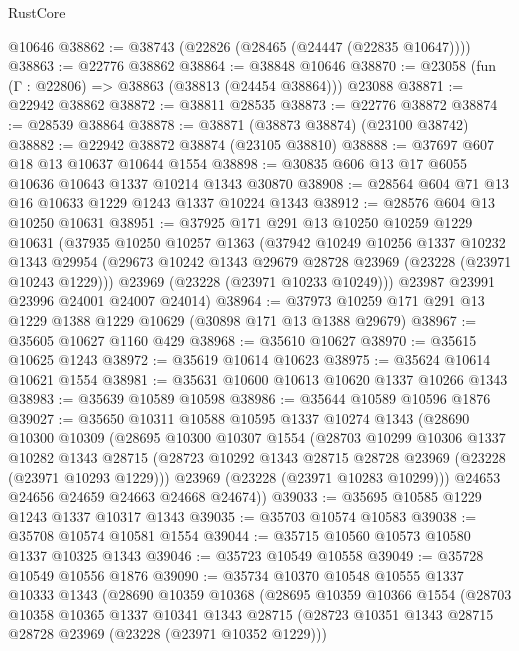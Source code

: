 \begin{lexlean}{RustCore}
\begin{coremodule}
    @10646
@38862 := @38743 (@22826 (@28465 (@24447 (@22835 @10647))))
@38863 := @22776 @38862
@38864 := @38848 @10646
@38870 := @23058 (fun (Γ : @22806) => @38863 (@38813 (@24454 @38864))) @23088
@38871 := @22942 @38862
@38872 := @38811 @28535
@38873 := @22776 @38872
@38874 := @28539 @38864
@38878 := @38871 (@38873 @38874) (@23100 @38742)
@38882 := @22942 @38872 @38874 (@23105 @38810)
@38888 := @37697 @607 @18 @13 @10637 @10644 @1554
@38898 := @30835 @606 @13 @17 @6055 @10636 @10643 @1337 @10214 @1343 @30870
@38908 := @28564 @604 @71 @13 @16 @10633 @1229 @1243 @1337 @10224 @1343
@38912 := @28576 @604 @13 @10250 @10631
@38951 := @37925
    @171
    @291
    @13
    @10250
    @10259
    @1229
    @10631
    (@37935
      @10250
      @10257
      @1363
      (@37942
        @10249
        @10256
        @1337
        @10232
        @1343
        @29954
        (@29673 @10242 @1343 @29679 @28728 @23969 (@23228 (@23971 @10243 @1229)))
        @23969
        (@23228 (@23971 @10233 @10249)))
      @23987
      @23991
      @23996
      @24001
      @24007
      @24014)
@38964 := @37973 @10259 @171 @291 @13 @1229 @1388 @1229 @10629 (@30898 @171 @13 @1388 @29679)
@38967 := @35605 @10627 @1160 @429
@38968 := @35610 @10627
@38970 := @35615 @10625 @1243
@38972 := @35619 @10614 @10623
@38975 := @35624 @10614 @10621 @1554
@38981 := @35631 @10600 @10613 @10620 @1337 @10266 @1343
@38983 := @35639 @10589 @10598
@38986 := @35644 @10589 @10596 @1876
@39027 := @35650
    @10311
    @10588
    @10595
    @1337
    @10274
    @1343
    (@28690
      @10300
      @10309
      (@28695
        @10300
        @10307
        @1554
        (@28703
          @10299
          @10306
          @1337
          @10282
          @1343
          @28715
          (@28723 @10292 @1343 @28715 @28728 @23969 (@23228 (@23971 @10293 @1229)))
          @23969
          (@23228 (@23971 @10283 @10299)))
        @24653
        @24656
        @24659
        @24663
        @24668
        @24674))
@39033 := @35695 @10585 @1229 @1243 @1337 @10317 @1343
@39035 := @35703 @10574 @10583
@39038 := @35708 @10574 @10581 @1554
@39044 := @35715 @10560 @10573 @10580 @1337 @10325 @1343
@39046 := @35723 @10549 @10558
@39049 := @35728 @10549 @10556 @1876
@39090 := @35734
    @10370
    @10548
    @10555
    @1337
    @10333
    @1343
    (@28690
      @10359
      @10368
      (@28695
        @10359
        @10366
        @1554
        (@28703
          @10358
          @10365
          @1337
          @10341
          @1343
          @28715
          (@28723 @10351 @1343 @28715 @28728 @23969 (@23228 (@23971 @10352 @1229)))

\end{coremodule}
\end{lexlean}
